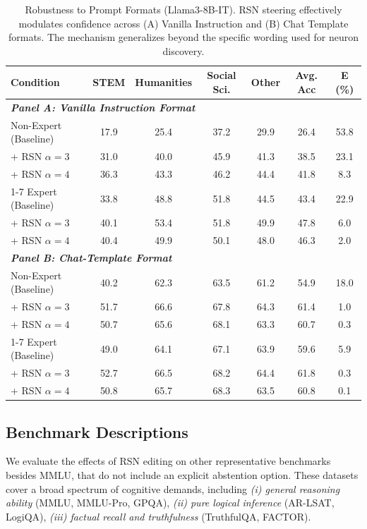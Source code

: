 \documentclass{article}
\begin{document}
\begin{table}[htbp]
\centering
\caption{Robustness to Prompt Formats (Llama3-8B-IT). RSN steering effectively modulates confidence across (A) Vanilla Instruction and (B) Chat Template formats. The mechanism generalizes beyond the specific wording used for neuron discovery.}
\label{tab:prompt-generalization}
\setlength{\tabcolsep}{5pt}
\renewcommand{\arraystretch}{1.05}
\small
\begin{tabular}{l c c c c c c}
\toprule
\textbf{Condition} & \textbf{STEM} & \textbf{Humanities} & \textbf{Social Sci.} & \textbf{Other} & \textbf{Avg. Acc} & \textbf{E (\%)} \\
\midrule
\multicolumn{7}{l}{\textit{\textbf{Panel A: Vanilla Instruction Format}}} \\
Non-Expert (Baseline) & 17.9 & 25.4 & 37.2 & 29.9 & 26.4 & 53.8 \\
+ RSN $\alpha=3$      & 31.0 & 40.0 & 45.9 & 41.3 & 38.5 & 23.1 \\
+ RSN $\alpha=4$      & 36.3 & 43.3 & 46.2 & 44.4 & 41.8 & 8.3 \\
\cmidrule(lr){1-7}
Expert (Baseline)     & 33.8 & 48.8 & 51.8 & 44.5 & 43.4 & 22.9 \\
+ RSN $\alpha=3$      & 40.1 & 53.4 & 51.8 & 49.9 & 47.8 & 6.0 \\
+ RSN $\alpha=4$      & 40.4 & 49.9 & 50.1 & 48.0 & 46.3 & 2.0 \\
\midrule
\multicolumn{7}{l}{\textit{\textbf{Panel B: Chat-Template Format}}} \\
Non-Expert (Baseline) & 40.2 & 62.3 & 63.5 & 61.2 & 54.9 & 18.0 \\
+ RSN $\alpha=3$      & 51.7 & 66.6 & 67.8 & 64.3 & 61.4 & 1.0 \\
+ RSN $\alpha=4$      & 50.7 & 65.6 & 68.1 & 63.3 & 60.7 & 0.3 \\
\cmidrule(lr){1-7}
Expert (Baseline)     & 49.0 & 64.1 & 67.1 & 63.9 & 59.6 & 5.9 \\
+ RSN $\alpha=3$      & 52.7 & 66.5 & 68.2 & 64.4 & 61.8 & 0.3 \\
+ RSN $\alpha=4$      & 50.8 & 65.7 & 68.3 & 63.5 & 60.8 & 0.1 \\
\bottomrule
\end{tabular}
\end{table}

\subsection{Benchmark Descriptions}
\label{app:datasets}
We evaluate the effects of RSN editing on other representative benchmarks besides MMLU, that do not include an explicit abstention option.  These datasets cover a broad spectrum of cognitive demands, including \emph{(i) general reasoning ability} (MMLU, MMLU-Pro, GPQA), \emph{(ii) pure logical inference} (AR-LSAT, LogiQA), \emph{(iii) factual recall and truthfulness} (TruthfulQA, FACTOR).
\end{document}

